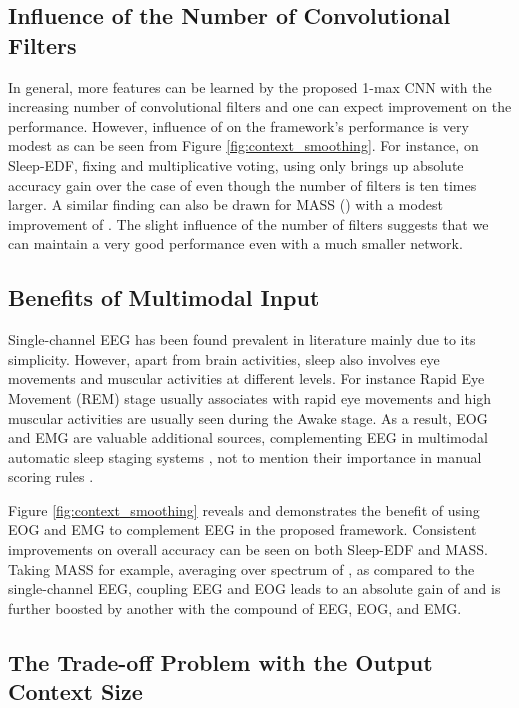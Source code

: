 \documentclass[10pt,twocolumn,twoside]{IEEEtran}
\begin{document}
\subsection{Influence of the Number of Convolutional Filters}

In general, more features can be learned by the proposed 1-max CNN with the increasing number of convolutional filters  and one can expect improvement on the performance. However, influence of  on the framework's performance is very modest as can be seen from Figure \ref{fig:context_smoothing}. 
For instance, on Sleep-EDF, fixing  and multiplicative voting, using  only brings up  absolute accuracy gain over the case of  even though the number of filters is ten times larger. A similar finding can also be drawn for MASS () with a modest improvement of . The slight influence of the number of filters  suggests that we can maintain a very good performance even with a much smaller network.

\subsection{Benefits of Multimodal Input}

Single-channel EEG has been found prevalent in literature \cite{Koley2012, Kuo2011, Supratak2017, Tsinalis2016, Phan2018c, Phan2018d} mainly due to its simplicity. However, apart from brain activities, sleep also involves eye movements and muscular activities at different levels. For instance Rapid Eye Movement (REM) stage usually associates with rapid eye movements and high muscular activities are usually seen during the Awake stage. As a result, EOG and EMG are valuable additional sources, complementing EEG in multimodal automatic sleep staging systems \cite{Chambon2018, Lajnef2015, Huang2014, Mikkelsen2018, Andreotti2018, Stephansen2017}, not to mention their importance in manual scoring rules \cite{Hobson1969,Iber2007}.

Figure \ref{fig:context_smoothing} reveals and demonstrates the benefit of using EOG and EMG to complement EEG in the proposed framework. Consistent improvements on overall accuracy can be seen on both Sleep-EDF and MASS. Taking MASS for example, averaging over spectrum of , as compared to the single-channel EEG, coupling EEG and EOG leads to an absolute gain of  and is further boosted by another  with the compound of EEG, EOG, and EMG. 

\subsection{The Trade-off Problem with the Output Context Size}
\end{document}
